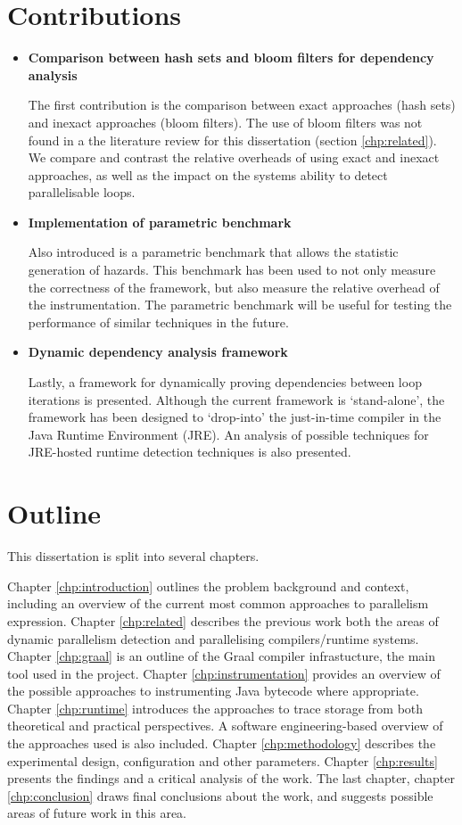 \section{Contributions} \label{sec:introduction/contributions}
\begin{itemize}
	\item \textbf{Comparison between hash sets and bloom filters for dependency analysis}
	
	The first contribution is the comparison between exact approaches (hash sets) and inexact approaches (bloom filters). The use of bloom filters was not found in a the literature review for this dissertation (section \ref{chp:related}). We compare and contrast the relative overheads of using exact and inexact approaches, as well as the impact on the systems ability to detect parallelisable loops.

	\item \textbf{Implementation of parametric benchmark}
	
	Also introduced is a parametric benchmark that allows the statistic generation of hazards. This benchmark has been used to not only measure the correctness of the framework, but also measure the relative overhead of the instrumentation. The parametric benchmark will be useful for testing the performance of similar techniques in the future.

	\item \textbf{Dynamic dependency analysis framework}
	
	Lastly, a framework for dynamically proving dependencies between loop iterations is presented. Although the current framework is `stand-alone', the framework has been designed to `drop-into' the just-in-time compiler in the Java Runtime Environment (JRE). An analysis of possible techniques for JRE-hosted runtime detection techniques is also presented.
\end{itemize}

\section{Outline} \label{sec:introduction/outline}
This dissertation is split into several chapters.

Chapter \ref{chp:introduction} outlines the problem background and context, including an overview of the current most common approaches to parallelism expression. Chapter \ref{chp:related} describes the previous work both the areas of dynamic parallelism detection and parallelising compilers/runtime systems. Chapter \ref{chp:graal} is an outline of the Graal compiler infrastucture, the main tool used in the project. Chapter \ref{chp:instrumentation} provides an overview of the possible approaches to instrumenting Java bytecode where appropriate. Chapter \ref{chp:runtime} introduces the approaches to trace storage from both theoretical and practical perspectives. A software engineering-based overview of the approaches used is also included. Chapter \ref{chp:methodology} describes the experimental design, configuration and other parameters. Chapter \ref{chp:results} presents the findings and a critical analysis of the work. The last chapter, chapter \ref{chp:conclusion} draws final conclusions about the work, and suggests possible areas of future work in this area.